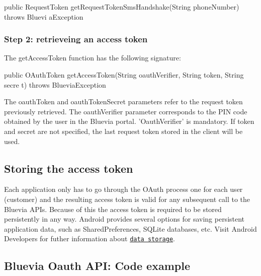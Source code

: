 \begin{DoxyCode}
public RequestToken getRequestTokenSmsHandshake(String phoneNumber) throws Bluevi
      aException
\end{DoxyCode}
\hypertarget{blv_oauth_guide_retrieving_access_token_sec}{}\subsubsection{Step 2: retrieveing an access token}\label{blv_oauth_guide_retrieving_access_token_sec}
The getAccessToken function has the following signature:


\begin{DoxyCode}
public OAuthToken getAccessToken(String oauthVerifier, String token, String secre
      t) throws BlueviaException
\end{DoxyCode}


The oauthToken and oauthTokenSecret parameters refer to the request token previously retrieved. The oauthVerifier parameter corresponds to the PIN code obtained by the user in the Bluevia portal. 'OauthVerifier' is mandatory. If token and secret are not specified, the last request token stored in the client will be used.\hypertarget{blv_oauth_guide_oauth_store_tokens}{}\subsection{Storing the access token}\label{blv_oauth_guide_oauth_store_tokens}
Each application only has to go through the OAuth process one for each user (customer) and the resulting access token is valid for any subsequent call to the Bluevia APIs. Because of this the access token is required to be stored persistently in any way. Android provides several options for saving persistent application data, such as SharedPreferences, SQLite databases, etc. Visit Android Developers for futher information about \href{http://developer.android.com/guide/topics/data/data-storage.html}{\tt data storage}.\hypertarget{blv_oauth_guide_oauth_code_example_sec}{}\subsection{Bluevia Oauth API: Code example}\label{blv_oauth_guide_oauth_code_example_sec}

